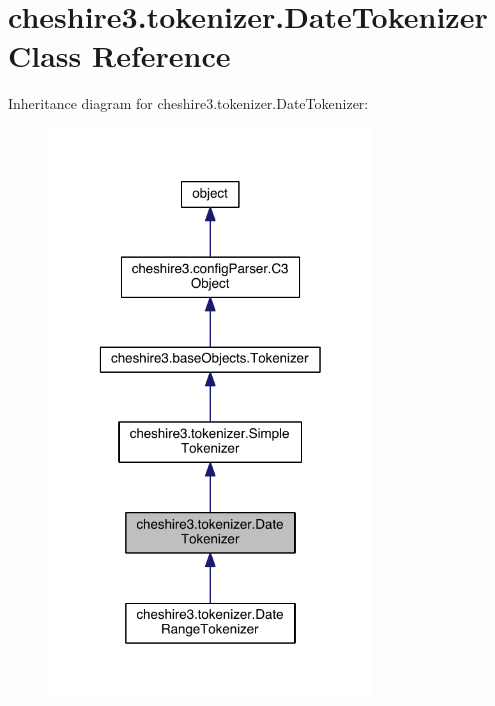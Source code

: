 \hypertarget{classcheshire3_1_1tokenizer_1_1_date_tokenizer}{\section{cheshire3.\-tokenizer.\-Date\-Tokenizer Class Reference}
\label{classcheshire3_1_1tokenizer_1_1_date_tokenizer}
}


Inheritance diagram for cheshire3.\-tokenizer.\-Date\-Tokenizer\-:
\nopagebreak
\begin{figure}[H]
\begin{center}
\leavevmode
\includegraphics[width=244pt]{classcheshire3_1_1tokenizer_1_1_date_tokenizer__inherit__graph}
\end{center}
\end{figure}


